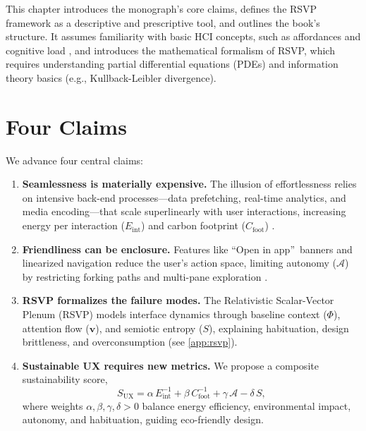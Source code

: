 \documentclass[openany]{book}
\newcommand{\PhiS}{\Phi} %
\newcommand{\vvec}{\mathbf{v}} %
\newcommand{\Sent}{S} %
\newcommand{\Eint}{E_{\mathrm{int}}} %
\newcommand{\Cfoot}{C_{\mathrm{foot}}} %
\newcommand{\Auton}{\mathcal{A}} %
\newcommand{\SUX}{S_{\mathrm{UX}}} %
\begin{document}
This chapter introduces the monograph’s core claims, defines the RSVP framework as a descriptive and prescriptive tool, and outlines the book’s structure. It assumes familiarity with basic HCI concepts, such as affordances and cognitive load \citep{norman1988}, and introduces the mathematical formalism of RSVP, which requires understanding partial differential equations (PDEs) and information theory basics (e.g., Kullback-Leibler divergence).

\section{Four Claims}
\label{sec:intro-claims}
We advance four central claims:
\begin{enumerate}[label=\textbf{C\arabic*}.]
  \item \textbf{Seamlessness is materially expensive.} The illusion of effortlessness relies on intensive back-end processes---data prefetching, real-time analytics, and media encoding---that scale superlinearly with user interactions, increasing energy per interaction (\(\Eint\)) and carbon footprint (\(\Cfoot\)) \citep{extentia2024}.
  \item \textbf{Friendliness can be enclosure.} Features like \textquotedblleft Open in app\textquotedblright\ banners and linearized navigation reduce the user’s action space, limiting autonomy (\(\Auton\)) by restricting forking paths and multi-pane exploration \citep{doctorow2022}.
  \item \textbf{RSVP formalizes the failure modes.} The Relativistic Scalar-Vector Plenum (RSVP) models interface dynamics through baseline context (\(\PhiS\)), attention flow (\(\vvec\)), and semiotic entropy (\(\Sent\)), explaining habituation, design brittleness, and overconsumption (see \cref{app:rsvp}).
  \item \textbf{Sustainable UX requires new metrics.} We propose a composite sustainability score,
  \begin{equation}
  \label{eq:intro-SUX}
  \SUX = \alpha\,\Eint^{-1} + \beta\,\Cfoot^{-1} + \gamma\,\Auton - \delta\,\Sent,
  \end{equation}
  where weights \(\alpha, \beta, \gamma, \delta > 0\) balance energy efficiency, environmental impact, autonomy, and habituation, guiding eco-friendly design.
\end{enumerate}
\end{document}

